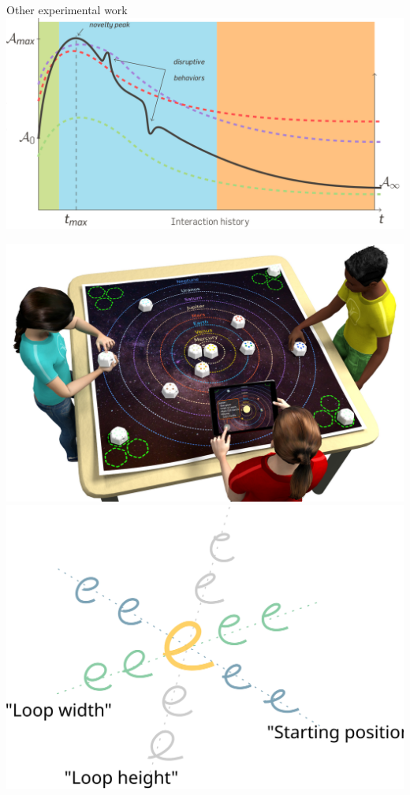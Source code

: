\documentclass[xcolor=table]{beamer}
\begin{document}
\begin{frame}{Other experimental work}
            \hspace{0.5em}
            \hyperlink{anthropomorphism}{\includegraphics[height=0.2\paperheight]{dynamics_anthropo}}

            \hyperlink{cellulo}{\includegraphics[height=0.2\paperheight]{cellulo/concept-solar-system}}
            \hspace{0.5em}
            \hyperlink{cowriter-impl}{\includegraphics[height=0.2\paperheight]{cowriter/pca}}


\end{frame}
\end{document}
